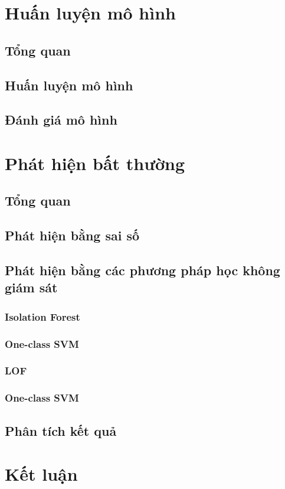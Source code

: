 \section{Huấn luyện mô hình}
\subsection{Tổng quan}
\subsection{Huấn luyện mô hình}
\subsection{Đánh giá mô hình}

\section{Phát hiện bất thường}
\subsection{Tổng quan}
\subsection{Phát hiện bằng sai số}
\subsection{Phát hiện bằng các phương pháp học không giám sát}
\subsubsection{Isolation Forest}
\subsubsection{One-class SVM}
\subsubsection{LOF}
\subsubsection{One-class SVM}
\subsection{Phân tích kết quả}


\section{Kết luận}

